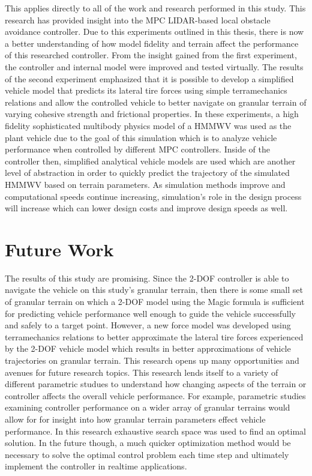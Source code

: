 \documentclass[12pt,onecolumn]{report}
\newcommand{\CHRONO}{{\sffamily{{Chrono}}}}
\begin{document}
This applies directly to all of the work and research performed in this study. This research has provided insight into the MPC LIDAR-based local obstacle avoidance controller. Due to this experiments outlined in this thesis, there is now a better understanding of how model fidelity and terrain affect the performance of this researched controller. From the insight gained from the first experiment, the controller and internal model were improved and tested virtually. The results of the second experiment emphasized that it is possible to develop a simplified vehicle model that predicts its lateral tire forces using simple terramechanics relations and allow the controlled vehicle to better navigate on granular terrain of varying cohesive strength and frictional properties. In these experiments, a high fidelity sophisticated multibody physics model of a HMMWV was used as the plant vehicle due to the goal of this simulation which is to analyze vehicle performance when controlled by different MPC controllers. Inside of the controller then, simplified analytical vehicle models are used which are another level of abstraction in order to quickly predict the trajectory of the simulated HMMWV based on terrain parameters. As simulation methods improve and computational speeds continue increasing, simulation's role in the design process will increase which can lower design costs and improve design speeds as well. 

\section{Future Work}\label{s:FutureWork}

The results of this study are promising. Since the 2-DOF controller is able to navigate the {\CHRONO} vehicle on this study's granular terrain, then there is some small set of granular terrain on which a 2-DOF model using the Magic formula is sufficient for predicting vehicle performance well enough to guide the vehicle successfully and safely to a target point. However, a new force model was developed using terramechanics relations to better approximate the lateral tire forces experienced by the 2-DOF vehicle model which results in better approximations of vehicle trajectories on granular terrain. This research opens up many opportunities and avenues for future research topics. This research lends itself to a variety of different parametric studues to understand how changing aspects of the terrain or controller affects the overall vehicle performance. For example, parametric studies examining controller performance on a wider array of granular terrains would allow for for insight into how granular terrain parameters effect vehicle performance. In this research exhaustive search space was used to find an optimal solution. In the future though, a much quicker optimization method would be necessary to solve the optimal control problem each time step and ultimately implement the controller in realtime applications. 
\end{document}

